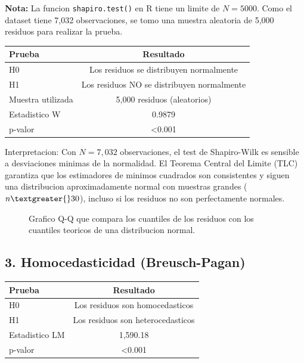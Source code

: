 \documentclass[12pt,a4paper]{article}
\begin{document}
\textbf{Nota:} La funcion \texttt{shapiro.test()} en R tiene un limite de $N = 5000$. Como el dataset tiene 7,032 observaciones, se tomo una muestra aleatoria de 5,000 residuos para realizar la prueba.

\begin{table}[H]
\centering
\begin{tabular}{lc}
\toprule
\textbf{Prueba} & \textbf{Resultado} \\
\midrule
H0 & Los residuos se distribuyen normalmente \\
H1 & Los residuos NO se distribuyen normalmente \\
Muestra utilizada & 5,000 residuos (aleatorios) \\
Estadistico W & 0.9879 \\
p-valor & \textless{}0.001 \\
\bottomrule
\end{tabular}
\end{table}

Interpretacion: Con $N = 7,032$ observaciones, el test de Shapiro-Wilk es sensible a desviaciones minimas de la normalidad. El Teorema Central del Limite (TLC) garantiza que los estimadores de minimos cuadrados son consistentes y siguen una distribucion aproximadamente normal con muestras grandes ($n \textgreater{} 30$), incluso si los residuos no son perfectamente normales.

\begin{figure}[H]
    \centering
    \caption{Grafico Q-Q que compara los cuantiles de los residuos con los cuantiles teoricos de una distribucion normal.}
    \label{fig:qqplot}
\end{figure}

\subsection{3. Homocedasticidad (Breusch-Pagan)}

\begin{table}[H]
\centering
\begin{tabular}{lc}
\toprule
\textbf{Prueba} & \textbf{Resultado} \\
\midrule
H0 & Los residuos son homocedasticos \\
H1 & Los residuos son heterocedasticos \\
Estadistico LM & 1,590.18 \\
p-valor & \textless{}0.001 \\
\bottomrule
\end{tabular}
\end{table}
\end{document}
